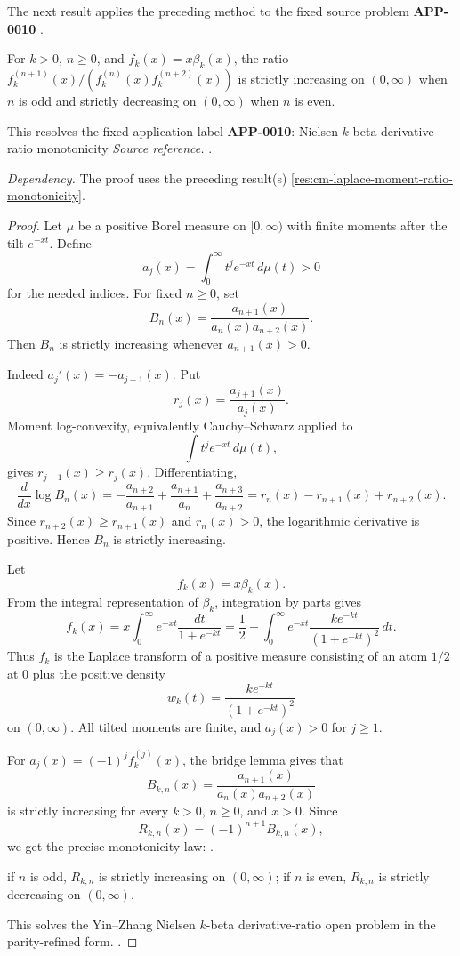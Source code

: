 The next result applies the preceding method to the fixed source problem \textbf{APP-0010} \cite{yin-zhang-k-beta}.
\begin{corollary}
\label{res:nielsen-k-beta-derivative-ratio-monotonicity}
For \(k>0\), \(n\ge0\), and \(f_k(x)=x\beta_k(x)\), the ratio \(f_k^{(n+1)}(x)/(f_k^{(n)}(x)f_k^{(n+2)}(x))\) is strictly increasing on \((0,\infty)\) when \(n\) is odd and strictly decreasing on \((0,\infty)\) when \(n\) is even.

This resolves the fixed application label \textbf{APP-0010}: Nielsen \(k\)-beta derivative-ratio monotonicity
\emph{Source reference.} \cite{yin-zhang-k-beta}.

\emph{Dependency.} The proof uses the preceding result(s) \ref{res:cm-laplace-moment-ratio-monotonicity}.
\end{corollary}
\begin{proof}
Let \(\mu\) be a positive Borel measure on \([0,\infty)\) with finite moments after the tilt \(e^{-xt}\). Define
\[
a_j(x)=\int_0^\infty t^j e^{-xt}\,d\mu(t)>0
\]
for the needed indices. For fixed \(n\ge0\), set
\[
B_n(x)=\frac{a_{n+1}(x)}{a_n(x)a_{n+2}(x)}.
\]
Then \(B_n\) is strictly increasing whenever \(a_{n+1}(x)>0\).

Indeed \(a_j'(x)=-a_{j+1}(x)\). Put
\[
r_j(x)=\frac{a_{j+1}(x)}{a_j(x)}.
\]
Moment log-convexity, equivalently Cauchy--Schwarz applied to
\[
\int t^j e^{-xt}\,d\mu(t),
\]
gives \(r_{j+1}(x)\ge r_j(x)\). Differentiating,
\[
\frac{d}{dx}\log B_n(x)
=-\frac{a_{n+2}}{a_{n+1}}
+\frac{a_{n+1}}{a_n}
+\frac{a_{n+3}}{a_{n+2}}
=r_n(x)-r_{n+1}(x)+r_{n+2}(x).
\]
Since \(r_{n+2}(x)\ge r_{n+1}(x)\) and \(r_n(x)>0\), the logarithmic derivative is positive. Hence \(B_n\) is strictly increasing.

Let
\[
f_k(x)=x\beta_k(x).
\]
From the integral representation of \(\beta_k\), integration by parts gives
\[
f_k(x)
=x\int_0^\infty e^{-xt}\frac{dt}{1+e^{-kt}}
=\frac12+\int_0^\infty e^{-xt}\frac{k e^{-kt}}{(1+e^{-kt})^2}\,dt.
\]
Thus \(f_k\) is the Laplace transform of a positive measure consisting of an atom \(1/2\) at \(0\) plus the positive density
\[
w_k(t)=\frac{k e^{-kt}}{(1+e^{-kt})^2}
\]
on \((0,\infty)\). All tilted moments are finite, and \(a_{j}(x)>0\) for \(j\ge1\).

For \(a_j(x)=(-1)^j f_k^{(j)}(x)\), the bridge lemma gives that
\[
B_{k,n}(x)=\frac{a_{n+1}(x)}{a_n(x)a_{n+2}(x)}
\]
is strictly increasing for every \(k>0\), \(n\ge0\), and \(x>0\). Since
\[
R_{k,n}(x)=(-1)^{n+1}B_{k,n}(x),
\]
we get the precise monotonicity law: \cite{yin-zhang-k-beta}.

if \(n\) is odd, \(R_{k,n}\) is strictly increasing on \((0,\infty)\);
if \(n\) is even, \(R_{k,n}\) is strictly decreasing on \((0,\infty)\).

This solves the Yin--Zhang Nielsen \(k\)-beta derivative-ratio open problem in the parity-refined form. \cite{yin-zhang-k-beta}.
\end{proof}

